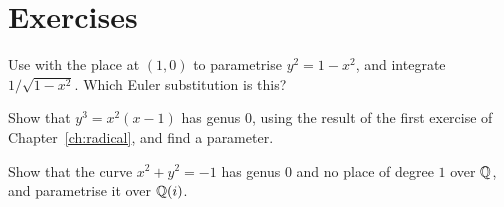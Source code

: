 \section*{Exercises}

\begin{exercise}
Use  with the place at $(1, 0)$ to parametrise $y^2
= 1 - x^2$, and integrate $1/\sqrt{1 - x^2}$. Which Euler substitution is
this?
\end{exercise}

\begin{exercise}
Show that $y^3 = x^2 (x - 1)$ has genus $0$, using the result of the first
exercise of Chapter~\ref{ch:radical}, and find a parameter.
\end{exercise}

\begin{exercise}
Show that the curve $x^2 + y^2 = -1$ has genus $0$ and no place of degree $1$
over $\mathbb{Q}$, and parametrise it over $\mathbb{Q}(i)$.
\end{exercise}

